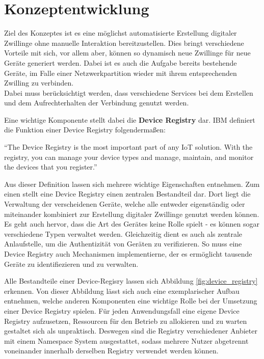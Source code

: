 \chapter{Konzeptentwicklung}

Ziel des Konzeptes ist es eine möglichst automatisierte Erstellung digitaler Zwillinge ohne manuelle Interaktion bereitzustellen. Dies bringt verschiedene Vorteile mit sich, vor allem aber, können so dynamisch neue Zwillinge für neue Geräte generiert werden. Dabei ist es auch die Aufgabe bereits bestehende Geräte, im Falle einer Netzwerkpartition wieder mit ihrem entsprechenden Zwilling zu verbinden.\\
Dabei muss berücksichtigt werden, dass verschiedene Services bei dem Erstellen und dem Aufrechterhalten der Verbindung genutzt werden.

Eine wichtige Komponente stellt dabei die \textbf{Device Registry} dar. IBM definiert die Funktion einer Device Registry folgendermaßen:

\begin{definition}
    \enquote{The Device Registry is the most important part of any IoT solution. With the registry, you can manage your device types and manage, maintain, and monitor the devices that you register.}\autocite{ibm_dr}
\end{definition}

Aus dieser Definition lassen sich mehrere wichtige Eigenschaften entnehmen. Zum einen stellt eine Device Registry einen zentralen Bestandteil dar. Dort liegt die Verwaltung der verscheidenen Geräte, welche alle entweder eigenständig oder miteinander kombiniert zur Erstellung digitaler Zwillinge genutzt werden können. Es geht auch hervor, dass die Art des Gerätes keine Rolle spielt - es können sogar verschiedene Typen verwaltet werden. Gleichzeitig dient es auch als zentrale Anlaufstelle, um die Authentizität von Geräten zu verifizieren. So muss eine Device Registry auch Mechanismen implementierne, der es ermöglicht tausende Geräte zu identifiezieren und zu verwalten.

Alle Bestandteile einer Device-Regisry lassen sich Abbildung \vref{fig:device_registry} erkennen. Von dieser Abbildung lässt sich auch eine exemplarischer Aufbau entnehmen, welche anderen Komponenten eine wichtige Rolle bei der Umsetzung einer Device Registry spielen. Für jeden Anwendungsfall eine eigene Device Registry aufzusetzen, Ressourcen für den Betrieb zu allokieren und zu warten gestaltet sich als unpraktisch. 
Deswegen sind die Registry verschiedener Anbieter  mit einem Namespace System ausgestattet, sodass mehrere Nutzer abgetrennt voneinander innerhalb derselben Registry verwendet werden können.

